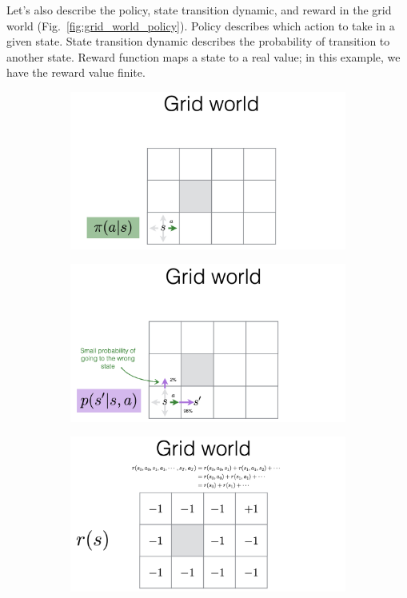 \documentclass[11pt]{article}
\begin{document}
Let's also describe the policy, state transition dynamic, and reward in the grid world (Fig.~\ref{fig:grid_world_policy}). Policy describes which action to take in a given state. State transition dynamic describes the probability of transition to another state. Reward function maps a state to a real value; in this example, we have the reward value finite.
\begin{figure}[H]
    \centering
     \begin{subfigure}{0.3\linewidth}
         \includegraphics[width=\linewidth]{images/policy.png}
     \end{subfigure}%
     \begin{subfigure}{0.3\linewidth}
         \includegraphics[width=\linewidth]{images/state_transition.png}
     \end{subfigure}%
     \begin{subfigure}{0.3\linewidth}
         \includegraphics[width=\linewidth]{images/reward.png}

\end{subfigure}
\end{figure}
\end{document}
